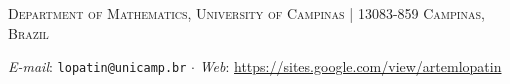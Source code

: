 \documentclass[a4paper,10pt]{amsart}
\begin{document}
\vskip 0.5cm


{\footnotesize
\textsc{Department of Mathematics, University of Campinas
| 13083-859 Campinas, Brazil}}

{\footnotesize
\textit{E-mail}: \texttt{lopatin@unicamp.br}
$\cdot$
\textit{Web}: \url{https://sites.google.com/view/artemlopatin}
}
\end{document}
